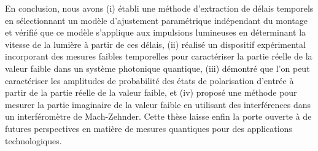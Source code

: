 \begin{onehalfspace}
    \noindent En conclusion, nous avons (i) établi une 
    méthode d’extraction de délais temporels en sélectionnant
    un modèle d’ajustement paramétrique indépendant du montage
    et vérifié que ce modèle s’applique aux impulsions lumineuses en déterminant la 
    vitesse de la lumière à partir de ces délais, (ii) réalisé un dispositif
    expérimental incorporant des mesures faibles temporelles
    pour caractériser la partie réelle de la valeur faible
    dans un système photonique quantique, (iii) démontré que
    l’on peut caractériser les amplitudes de probabilité
    des états de polarisation d’entrée à partir de la partie réelle
    de la valeur faible, et (iv) proposé une méthode pour mesurer
    la partie imaginaire de la valeur faible en utilisant
    des interférences dans un interféromètre de Mach-Zehnder.
    Cette thèse laisse enfin la porte ouverte à de
    futures perspectives en matière de mesures quantiques pour des
    applications technologiques.


\end{onehalfspace}
